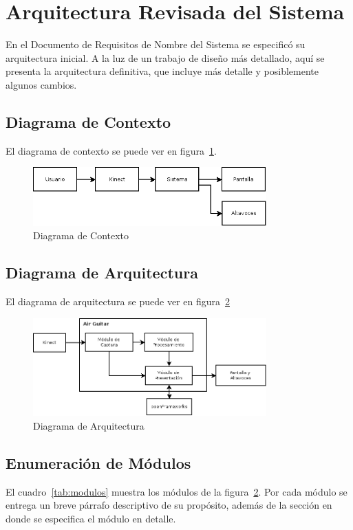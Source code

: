 \documentclass[a4paper,10pt]{article}
\begin{document}
\newpage
\tableofcontents

\listoftables

\listoffigures
\newpage

\section{Arquitectura Revisada del Sistema}
En el Documento de Requisitos de Nombre del Sistema se especificó su
arquitectura inicial. A la luz de un trabajo de diseño más detallado, aquí se
presenta la arquitectura definitiva, que incluye más detalle y posiblemente
algunos cambios.
\subsection{Diagrama de Contexto}
El diagrama de contexto se puede ver en figura~\ref{fig:contexto}.
\begin{figure}[h]
        \centering
        \includegraphics[width=0.8\textwidth]{../imagenes/diagrama_de_contexto.png}
        \caption{Diagrama de Contexto}
        \label{fig:contexto}
\end{figure}

\subsection{Diagrama de Arquitectura}
El diagrama de arquitectura se puede ver en figura~\ref{fig:arquitectura}
\begin{figure}[h]
        \centering
        \includegraphics[width=0.8\textwidth]{../imagenes/diagrama_de_arquitectura.png}
        \caption{Diagrama de Arquitectura}
        \label{fig:arquitectura}
\end{figure}

\subsection{Enumeración de Módulos}
El cuadro~\ref{tab:modulos} muestra los módulos de la
figura~\ref{fig:arquitectura}. Por cada módulo se entrega un breve párrafo
descriptivo de su propósito, además de la sección en donde se especifica el
módulo en detalle.
\end{document}
